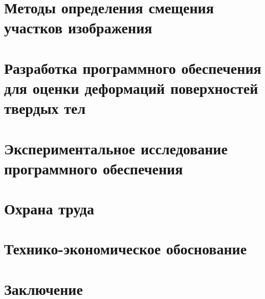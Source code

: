 




\newpage
{}
\renewcommand\contentsname{\hfill Содержание \hfill}
\tableofcontents

\section{Методы определения смещения участков изображения}

\section{Разработка программного обеспечения для оценки деформаций поверхностей твердых тел}

\newpage
\section{Экспериментальное исследование программного обеспечения}

\section{Охрана труда}

\section{Технико-экономическое обоснование}

\section{Заключение}

\newpage
\renewcommand{\refname}{Список использованных источников}


